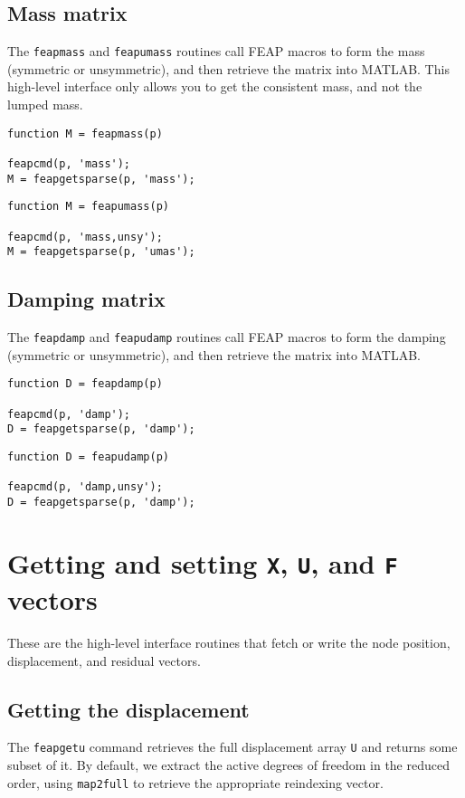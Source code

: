 \subsection{Mass matrix}

The {\tt feapmass} and {\tt feapumass} routines call FEAP macros
to form the mass (symmetric or unsymmetric), and then retrieve
the matrix into MATLAB.  This high-level interface only allows
you to get the consistent mass, and not the lumped mass.

\begin{verbatim}
function M = feapmass(p)

feapcmd(p, 'mass');
M = feapgetsparse(p, 'mass');
\end{verbatim}
\begin{verbatim}
function M = feapumass(p)

feapcmd(p, 'mass,unsy');
M = feapgetsparse(p, 'umas');
\end{verbatim}
\subsection{Damping matrix}

The {\tt feapdamp} and {\tt feapudamp} routines call FEAP macros
to form the damping (symmetric or unsymmetric), and then retrieve
the matrix into MATLAB.

\begin{verbatim}
function D = feapdamp(p)

feapcmd(p, 'damp');
D = feapgetsparse(p, 'damp');
\end{verbatim}
\begin{verbatim}
function D = feapudamp(p)

feapcmd(p, 'damp,unsy');
D = feapgetsparse(p, 'damp');
\end{verbatim}
\section {Getting and setting {\tt X}, {\tt U}, and {\tt F} vectors}

These are the high-level interface routines that fetch or write
the node position, displacement, and residual vectors.

\subsection{Getting the displacement}

The {\tt feapgetu} command retrieves the full displacement array
{\tt U} and returns some subset of it.  By default, we extract the
active degrees of freedom in the reduced order, using
{\tt map2full} to retrieve the appropriate reindexing vector.

